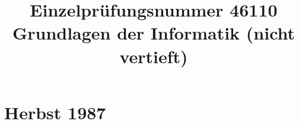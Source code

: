 \documentclass{lehramt-informatik-examen-sammlung}
\title{Einzelprüfungsnummer 46110\\Grundlagen der Informatik (nicht vertieft)}
\begin{document}
\maketitle
\tableofcontents

\section{Herbst 1987}

\end{document}
